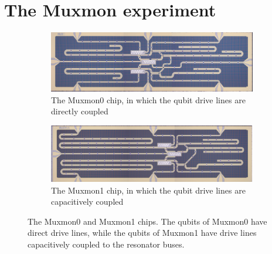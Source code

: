     \section{The Muxmon experiment}
      \label{sec: the Muxmon experiment}
      \begin{figure}[h]
      \centering
        \begin{subfigure}[b]{0.9\textwidth}
          \includegraphics[width=1\linewidth]{../Figures/MUX_0.jpg}
          \caption{The Muxmon0 chip, in which the qubit drive lines are directly coupled}
          \label{fig:Muxmon0 image}
        \end{subfigure}

        \begin{subfigure}[b]{0.9\textwidth}
          \includegraphics[width=1\linewidth]{../Figures/MUX_1.jpg}
          \caption{The Muxmon1 chip, in which the qubit drive lines are capacitively coupled}
          \label{fig:Muxmon1 image}
        \end{subfigure}
        \caption[Muxmon chips]{The Muxmon0 and Muxmon1 chips. The qubits of Muxmon0 have direct drive lines, while the qubits of Muxmon1 have drive lines capacitively coupled to the resonator buses.}
        \label{fig:Muxmon0 and Muxmon1}
      \end{figure}

